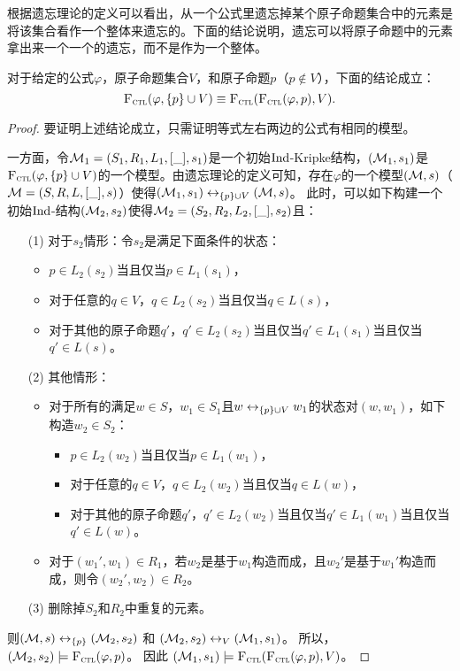 根据遗忘理论的定义可以看出，从一个公式里遗忘掉某个原子命题集合中的元素是将该集合看作一个整体来遗忘的。下面的结论说明，遗忘可以将原子命题中的元素拿出来一个一个的遗忘，而不是作为一个整体。
\begin{proposition}[Modularity]\label{disTF}
	对于给定的公式$\varphi$，原子命题集合$V$，和原子命题$p$（$p\not \in V$），下面的结论成立：
	\[
	{\textsc{F}_{\textsc{ctl}}}(\varphi,\{p\}\cup V) \equiv {\textsc{F}_{\textsc{ctl}}}({\textsc{F}_{\textsc{ctl}}}(\varphi,p),V).
	\]
\end{proposition}
\begin{proof}
	要证明上述结论成立，只需证明等式左右两边的公式有相同的模型。
	
	一方面，令${\cal M}_1=(S_1,R_1,L_1,[\_],s_1)$是一个初始$\textrm{Ind}$-Kripke结构，$({\cal M}_1,s_1)$是${\textsc{F}_{\textsc{ctl}}}(\varphi,\{p\}\cup V)$的一个模型。由遗忘理论的定义可知，存在$\varphi$的一个模型$(
	{\cal M},s)$（${\cal M}=(S,R,L,[\_],s)$）使得$({\cal M}_1,s_1)\leftrightarrow_{\{p\}\cup V} ({\cal M},s)$。
	此时，可以如下构建一个初始$\textrm{Ind}$-结构$({\cal M}_2,s_2)$使得${\cal M}_2=(S_2,R_2,L_2,[\_],s_2)$且：
	\begin{itemize}
		\item[(1)] 对于$s_2$情形：令$s_2$是满足下面条件的状态：
		\begin{itemize}
			\item $p \in L_2(s_2)$当且仅当$p\in L_1(s_1)$，
			\item 对于任意的$q \in V$，$q \in L_2(s_2)$当且仅当$q\in L(s)$，
			\item 对于其他的原子命题$q'$，$q' \in L_2(s_2)$当且仅当$q'\in L_1(s_1)$当且仅当$q'\in L(s)$。
		\end{itemize}
			
		\item[(2)] 其他情形：
		\begin{itemize}
			\item 对于所有的满足$w\in S$，$w_1\in S_1$且$w\leftrightarrow_{\{p\}\cup V} w_1$的状态对$(w,w_1)$，如下构造$w_2\in S_2$：
				\begin{itemize}
					\item $p \in L_2(w_2)$当且仅当$p\in L_1(w_1)$，
					\item 对于任意的$q \in V$，$q \in L_2(w_2)$当且仅当$q\in L(w)$，
					\item 对于其他的原子命题$q'$，$q' \in L_2(w_2)$当且仅当$q'\in L_1(w_1)$当且仅当$q'\in L(w)$。
				\end{itemize}
			\item 对于$(w_1',w_1)\in R_1$，若$w_2$是基于$w_1$构造而成，且$w_2'$是基于$w_1'$构造而成，则令$(w_2',w_2)\in R_2$。
		\end{itemize}
		\item[(3)] 删除掉$S_2$和$R_2$中重复的元素。
	\end{itemize}
则$({\cal M}, s) \leftrightarrow_{\{p\}} ({\cal M}_2, s_2)$ 和 $({\cal M}_2, s_2) \leftrightarrow_V ({\cal M}_1, s_1)$。 所以，$({\cal M}_2, s_2) \models {\textsc{F}_{\textsc{ctl}}}(\varphi, p)$。 因此 $({\cal M}_1, s_1) \models {\textsc{F}_{\textsc{ctl}}}({\textsc{F}_{\textsc{ctl}}}(\varphi, p), V)$。


\end{proof}
